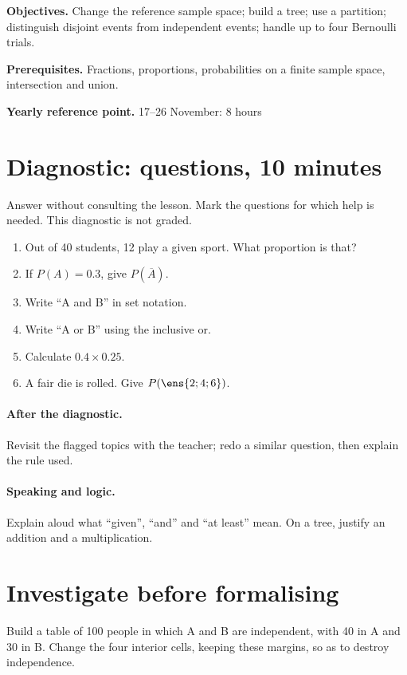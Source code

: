 \label{C05}
\begin{keypoint}
\textbf{Objectives.} Change the reference sample space; build a tree; use a partition; distinguish disjoint events from independent events; handle up to four Bernoulli trials.

\textbf{Prerequisites.} Fractions, proportions, probabilities on a finite sample space, intersection and union.

\textbf{Yearly reference point.} 17--26 November: 8 hours\end{keypoint}
\section*{Diagnostic:  questions, 10 minutes}\label{C05-D}
Answer without consulting the lesson. Mark the questions for which help is needed. This diagnostic is not graded.
\begin{enumerate}
\item Out of 40 students, 12 play a given sport. What proportion is that?
\item If $P(A)=\num{0,3}$, give $P(\overline A)$.
\item Write ``A and B'' in set notation.
\item Write ``A or B'' using the inclusive or.
\item Calculate $\num{0,4}\times\num{0,25}$.
\item A fair die is rolled. Give $P(\ens{2;4;6})$.
\end{enumerate}
\paragraph{After the diagnostic.} Revisit the flagged topics with the teacher; redo a similar question, then explain the rule used.
\paragraph{Speaking and logic.} Explain aloud what ``given'', ``and'' and ``at least'' mean. On a tree, justify an addition and a multiplication.
\mxnewpage
\section*{Investigate before formalising}\label{C05-RECH}
Build a table of 100 people in which A and B are independent, with 40 in A and 30 in B. Change the four interior cells, keeping these margins, so as to destroy independence.
